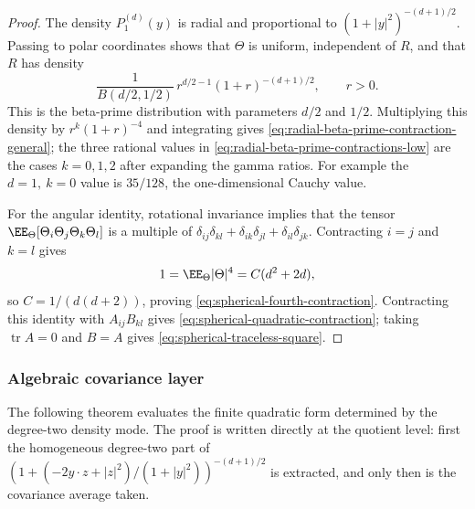 \begin{proof}
The density \(P_1^{(d)}(y)\) is radial and proportional to
\((1+|y|^2)^{-(d+1)/2}\).  Passing to polar coordinates shows that
\(\Theta\) is uniform, independent of \(R\), and that \(R\) has density
\[
\frac{1}{B(d/2,1/2)}\,r^{d/2-1}(1+r)^{-(d+1)/2},
\qquad r>0.
\]
This is the beta-prime distribution with parameters \(d/2\) and \(1/2\).
Multiplying this density by \(r^k(1+r)^{-4}\) and integrating gives
\eqref{eq:radial-beta-prime-contraction-general}; the three rational values
in \eqref{eq:radial-beta-prime-contractions-low} are the cases
\(k=0,1,2\) after expanding the gamma ratios.  For example the
\(d=1,\ k=0\) value is \(35/128\), the one-dimensional Cauchy value.

For the angular identity, rotational invariance implies that the tensor
\(\EE_\Theta[\Theta_i\Theta_j\Theta_k\Theta_l]\) is a multiple of
\(\delta_{ij}\delta_{kl}+\delta_{ik}\delta_{jl}+\delta_{il}\delta_{jk}\).
Contracting \(i=j\) and \(k=l\) gives
\[
1=\EE_\Theta|\Theta|^4=C(d^2+2d),
\]
so \(C=1/(d(d+2))\), proving
\eqref{eq:spherical-fourth-contraction}.  Contracting this identity with
\(A_{ij}B_{kl}\) gives \eqref{eq:spherical-quadratic-contraction}; taking
\(\operatorname{tr}A=0\) and \(B=A\) gives
\eqref{eq:spherical-traceless-square}.
\end{proof}

\subsubsection*{Algebraic covariance layer}\leavevmode\par\smallskip

The following theorem evaluates the finite quadratic form determined by the
degree-two density mode.  The proof is written directly at the quotient level:
first the homogeneous degree-two part of
\((1+(-2y\cdot z+|z|^2)/(1+|y|^2))^{-(d+1)/2}\) is extracted, and only then
is the covariance average taken.

